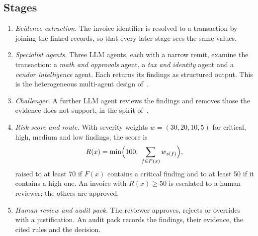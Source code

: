 \documentclass[conference]{IEEEtran}
\begin{document}
\subsection{Stages}
\begin{enumerate}
\item \textit{Evidence extraction.} The invoice identifier is resolved to a transaction by joining the linked records, so that every later stage sees the same values.
\item \textit{Specialist agents.} Three LLM agents, each with a narrow remit, examine the transaction: a \emph{math and approvals} agent, a \emph{tax and identity} agent and a \emph{vendor intelligence} agent. Each returns its findings as structured output. This is the heterogeneous multi-agent design of~\cite{liu2026survey}.
\item \textit{Challenger.} A further LLM agent reviews the findings and removes those the evidence does not support, in the spirit of~\cite{du2024}.
\item \textit{Risk score and route.} With severity weights $w=(30,20,10,5)$ for critical, high, medium and low findings, the score is
\begin{equation}
R(x)=\min\Bigl(100,\ \sum_{f\in F(x)} w_{s(f)}\Bigr),
\label{eq:score}
\end{equation}
raised to at least 70 if $F(x)$ contains a critical finding and to at least 50 if it contains a high one. An invoice with $R(x)\ge 50$ is escalated to a human reviewer; the others are approved.
\item \textit{Human review and audit pack.} The reviewer approves, rejects or overrides with a justification. An audit pack records the findings, their evidence, the cited rules and the decision.
\end{enumerate}
\end{document}
